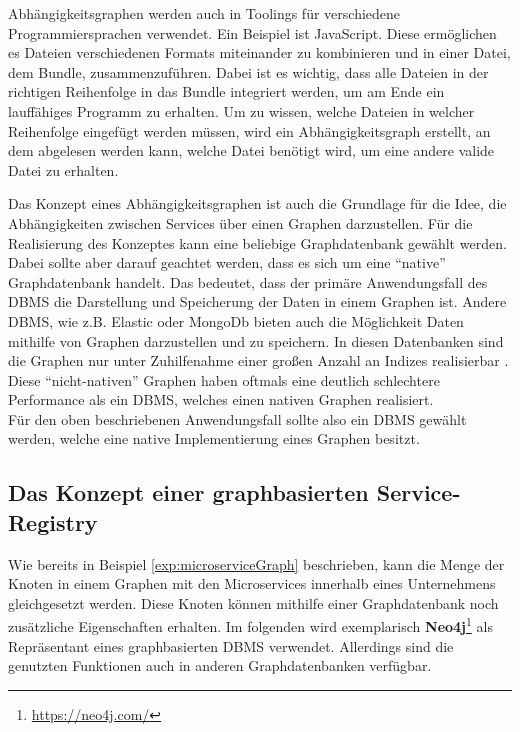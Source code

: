 \begin{example}[Abhängigkeitsgraphen]
	Abhängigkeitsgraphen werden auch in Toolings für verschiedene Programmiersprachen verwendet. Ein Beispiel ist JavaScript. Diese ermöglichen es Dateien verschiedenen Formats miteinander zu kombinieren und in einer Datei, dem Bundle, zusammenzuführen. Dabei ist es wichtig, dass alle Dateien in der richtigen Reihenfolge in das Bundle integriert werden, um am Ende ein lauffähiges Programm zu erhalten. Um zu wissen, welche Dateien in welcher Reihenfolge eingefügt werden müssen, wird ein Abhängigkeitsgraph erstellt, an dem abgelesen werden kann, welche Datei benötigt wird, um eine andere valide Datei zu erhalten.
\end{example}

Das Konzept eines Abhängigkeitsgraphen ist auch die Grundlage für die Idee, die Abhängigkeiten zwischen Services über einen Graphen darzustellen. Für die Realisierung des Konzeptes kann eine beliebige Graphdatenbank gewählt werden. Dabei sollte aber darauf geachtet werden, dass es sich um eine \enquote{native} Graphdatenbank handelt. Das bedeutet, dass der primäre Anwendungsfall des \ac{DBMS} die Darstellung und Speicherung der Daten in einem Graphen ist. Andere \ac{DBMS}, wie z.B. Elastic oder MongoDb bieten auch die Möglichkeit Daten mithilfe von Graphen darzustellen und zu speichern. In diesen Datenbanken sind die Graphen nur unter Zuhilfenahme einer großen Anzahl an Indizes realisierbar \autocite{JoyChao2016}. Diese \enquote{nicht-nativen} Graphen haben oftmals eine deutlich schlechtere Performance als ein \ac{DBMS}, welches einen nativen Graphen realisiert.\\
Für den oben beschriebenen Anwendungsfall sollte also ein \ac{DBMS} gewählt werden, welche eine native Implementierung eines Graphen besitzt.

\subsection{Das Konzept einer graphbasierten Service-Registry}

Wie bereits in Beispiel \vref{exp:microserviceGraph} beschrieben, kann die Menge der Knoten in einem Graphen mit den Microservices innerhalb eines Unternehmens gleichgesetzt werden. Diese Knoten können mithilfe einer Graphdatenbank noch zusätzliche Eigenschaften erhalten. Im folgenden wird exemplarisch \textbf{Neo4j}\footnote{\url{https://neo4j.com/}} als Repräsentant eines graphbasierten \ac{DBMS} verwendet. Allerdings sind die genutzten Funktionen auch in anderen Graphdatenbanken verfügbar.

